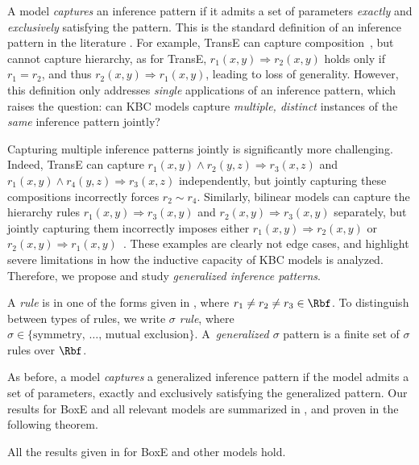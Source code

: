 \documentclass{article}
\begin{document}
A model \emph{captures} an inference pattern if it admits a set of parameters \emph{exactly} and \emph{exclusively} satisfying the pattern. This is the standard definition of an inference pattern in the literature \cite{RotatE-ICLR19}.
For example, TransE can capture composition~\cite{TransE-NIPS13,RotatE-ICLR19}, but cannot capture hierarchy, as for TransE,  ${r_1(x,y) \Rightarrow r_2(x,y)}$ holds only if $r_1 = r_2$, and thus $r_2(x,y) \Rightarrow r_1(x,y)$, leading to loss of generality. However, this definition only addresses \emph{single} applications of an inference pattern, which raises the question: can KBC models capture \emph{multiple, distinct} instances of the \emph{same} inference pattern jointly? 

Capturing multiple inference patterns jointly is significantly more challenging. Indeed, TransE can capture ${r_1(x,y) \land r_2(y,z) \Rightarrow r_3(x,z)}$ and ${r_1(x,y) \land r_4(y,z) \Rightarrow r_3(x,z)}$ independently, but jointly capturing these compositions incorrectly forces ${r_2 \sim r_4}$. Similarly, bilinear models can capture the hierarchy rules ${r_1(x,y) \Rightarrow r_3(x,y)}$ and ${r_2(x,y) \Rightarrow r_3(x,y)}$ separately, but jointly capturing them incorrectly imposes either ${r_1(x,y) \Rightarrow r_2(x,y)}$ or ${r_2(x,y) \Rightarrow r_1(x,y)}$~\cite{Gutirrez18}. These examples are clearly not edge cases, and highlight severe limitations in how the inductive capacity of KBC models is analyzed. Therefore, we propose and study \emph{generalized inference patterns}.

\begin{definition}
\label{def:gip}
A \emph{rule} is in one of the forms given in , where $r_1 \neq r_2  \neq r_3 \in \Rbf$.
To distinguish between types of rules, we write \emph{$\sigma$ rule}, where $\sigma \in \{\text{symmetry, \ldots, mutual exclusion}\}$.
A~\emph{generalized $\sigma$} pattern is a finite set of $\sigma$ rules over $\Rbf$. 
\end{definition}

As before, a model \emph{captures} a generalized inference pattern if the model admits a set of parameters, exactly and exclusively satisfying the generalized pattern. Our results for BoxE and all relevant models are summarized in , and proven in the following theorem. \begin{theorem}
\label{thm:genPat}
All the results given in  for BoxE and other models hold.
\end{theorem}
\end{document}
